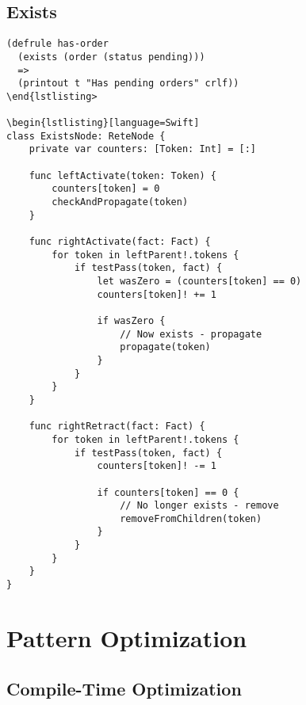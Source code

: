 \subsection{Exists}

\begin{lstlisting}[language=CLIPS]
(defrule has-order
  (exists (order (status pending)))
  =>
  (printout t "Has pending orders" crlf))
\end{lstlisting>

\begin{lstlisting}[language=Swift]
class ExistsNode: ReteNode {
    private var counters: [Token: Int] = [:]
    
    func leftActivate(token: Token) {
        counters[token] = 0
        checkAndPropagate(token)
    }
    
    func rightActivate(fact: Fact) {
        for token in leftParent!.tokens {
            if testPass(token, fact) {
                let wasZero = (counters[token] == 0)
                counters[token]! += 1
                
                if wasZero {
                    // Now exists - propagate
                    propagate(token)
                }
            }
        }
    }
    
    func rightRetract(fact: Fact) {
        for token in leftParent!.tokens {
            if testPass(token, fact) {
                counters[token]! -= 1
                
                if counters[token] == 0 {
                    // No longer exists - remove
                    removeFromChildren(token)
                }
            }
        }
    }
}
\end{lstlisting}

\section{Pattern Optimization}

\subsection{Compile-Time Optimization}

